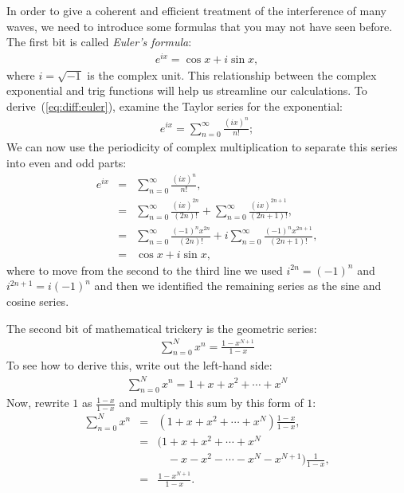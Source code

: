In order to give a coherent and efficient treatment of the interference 
of many waves, we need to introduce some formulas that you may not have 
seen before. The first bit is called {\em Euler's formula}:
\begin{eqnarray}
e^{ix} = \cos x + i \sin x, \label{eq:diff:euler}
\end{eqnarray}
where $i = \sqrt{-1}$ is the complex unit. This relationship between the 
complex exponential and trig functions will help us streamline our 
calculations. To derive~(\ref{eq:diff:euler}), examine the Taylor series 
for the exponential:
\begin{eqnarray*}
e^{ix} = \sum^\infty_{n=0} \frac{(ix)^n}{n!};
\end{eqnarray*}
We can now use the periodicity of complex multiplication to separate this
series into even and odd parts:
\begin{eqnarray*}
e^{ix} & = & \sum^\infty_{n=0} \frac{(ix)^n}{n!},\\
       & = & \sum^\infty_{n=0} \frac{(ix)^{2n}}{(2n)!} +
             \sum^\infty_{n=0} \frac{(ix)^{2n+1}}{(2n+1)!},\\
       & = & \sum^\infty_{n=0} \frac{(-1)^n x^{2n}}{(2n)!} +
            i\sum^\infty_{n=0} \frac{(-1)^n x^{2n+1}}{(2n+1)!},\\
       & = & \cos x + i \sin x,
\end{eqnarray*}
where to move from the second to the third line we used $i^{2n} = (-1)^n$ 
and $i^{2n+1} = i(-1)^n$ and then we identified the remaining series as
the sine and cosine series.

The second bit of mathematical trickery is the geometric series:
\begin{eqnarray*}
\sum^N_{n=0} x^n = \frac{1-x^{N+1}}{1-x}
\end{eqnarray*}
To see how to derive this, write out the left-hand side:
\begin{eqnarray*}
\sum^N_{n=0} x^n = 1 + x + x^2 + \cdots + x^N
\end{eqnarray*}
Now, rewrite $1$ as $\frac{1-x}{1-x}$ and multiply this sum by this form 
of $1$: 
\begin{eqnarray*}
\sum^N_{n=0} x^n & = & (1 + x + x^2 + \cdots + x^N) \frac{1-x}{1-x},\\
    & = & ( 1 + x + x^2 + \cdots + x^N\\ 
    &   & \phantom{(1} - x - x^2 - \cdots - x^N - x^{N+1} )
                   \frac{1}{1-x},\\
    & = & \frac{1-x^{N+1}}{1-x}.
\end{eqnarray*}

